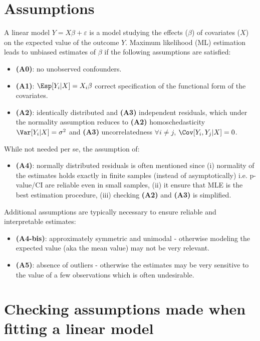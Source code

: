 \documentclass[12pt]{article}
\begin{document}
\section{Assumptions}
\label{sec:org7299424}
A linear model \(Y = X \beta + \varepsilon\) is a model studying the
 effects (\(\beta\)) of covariates (\(X\)) on the expected value of
 the outcome \(Y\). Maximum likelihood (ML) estimation leads to
 unbiased estimates of \(\beta\) if the following assumptions are
 satisfied:
\begin{itemize}
\item \textbf{(A0)}: no unobserved confounders.
\item \textbf{(A1)}: \(\Esp[Y_i|X] = X_i \beta\) correct specification of the
functional form of the covariates.
\item \textbf{(A2)}: identically distributed and \textbf{(A3)} independent residuals, which
under the normality assumption reduces to \textbf{(A2)} homoschedasticity
\(\Var[Y_i|X]= \sigma^2\) and \textbf{(A3)} uncorrelatedness \(\forall i \neq
  j\), \(\Cov[Y_i,Y_j|X]= 0\).
\end{itemize}
While not needed per se, the assumption of:
\begin{itemize}
\item \textbf{(A4)}: normally distributed residuals is often mentioned since (i)
normality of the estimates holds exactly in finite samples (instead
of asymptotically) i.e. p-value/CI are reliable even in small
samples, (ii) it ensure that MLE is the best estimation procedure,
(iii) checking \textbf{(A2)} and \textbf{(A3)} is simplified.
\end{itemize}
Additional assumptions are typically necessary to ensure reliable and
interpretable estimates:
\begin{itemize}
\item \textbf{(A4-bis)}: approximately symmetric and unimodal - otherwise modeling the
expected value (aka the mean value) may not be very relevant.
\item \textbf{(A5)}: absence of outliers - otherwise the estimates may be very
sensitive to the value of a few observations which is often
undesirable.
\end{itemize}

\clearpage

\section{Checking assumptions made when fitting a linear model}
\label{sec:orgff770b7}
\end{document}
